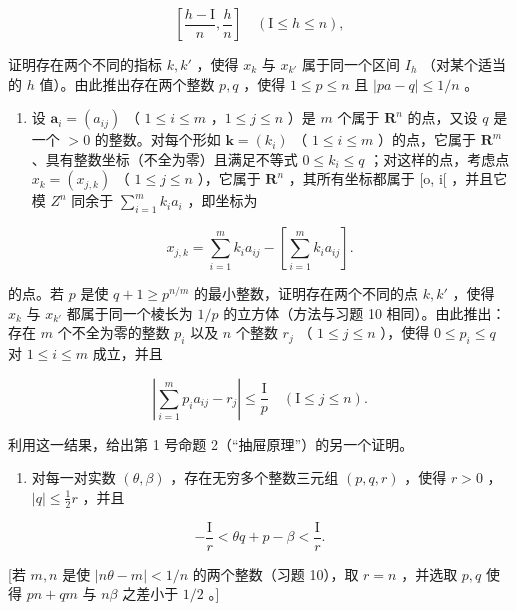\[
\left[ \frac {h - \mathrm{I}}{n}, \frac {h}{n} \right] \quad (\mathrm{I} \leqslant h \leqslant n),
\]

证明存在两个不同的指标 \(k, k'\) ，使得 \(x_k\) 与 \(x_{k'}\) 属于同一个区间 \(I_h\) （对某个适当的 \(h\) 值）。由此推出存在两个整数 \(p, q\) ，使得 \(1 \leqslant p \leqslant n\) 且 \(|pa - q| \leqslant 1 / n\) 。

\begin{enumerate}
\def\labelenumi{\Roman{enumi})}
\setcounter{enumi}{1}
\tightlist
\item
  设 \(\boldsymbol{a}_i = (a_{ij})\) （ \(1 \leqslant i \leqslant m\) ，\(1 \leqslant j \leqslant n\) ）是 \(m\) 个属于 \(\mathbf{R}^n\) 的点，又设 \(q\) 是一个 \(>0\) 的整数。对每个形如 \(\boldsymbol{k} = (k_i)\) （ \(1 \leqslant i \leqslant m\) ）的点，它属于 \(\mathbf{R}^m\) 、具有整数坐标（不全为零）且满足不等式 \(0 \leqslant k_i \leqslant q\) ；对这样的点，考虑点 \(x_k = (x_{j,k})\) （ \(1 \leqslant j \leqslant n\) ），它属于 \(\mathbf{R}^n\) ，其所有坐标都属于 {[}o, i{[} ，并且它模 \(Z^n\) 同余于 \(\sum_{i=1}^{m} k_i a_i\) ，即坐标为
\end{enumerate}

\[
x _ {j, k} = \sum_ {i = 1} ^ {m} k _ {i} a _ {i j} - \left[ \sum_ {i = 1} ^ {m} k _ {i} a _ {i j} \right].
\]

  的点。若 \(p\) 是使 \(q + 1 \geqslant p^{n/m}\) 的最小整数，证明存在两个不同的点 \(k, k'\) ，使得 \(x_k\) 与 \(x_{k'}\) 都属于同一个棱长为 \(1/p\) 的立方体（方法与习题 10 相同）。由此推出：存在 \(m\) 个不全为零的整数 \(p_i\) 以及 \(n\) 个整数 \(r_j\) （ \(1 \leqslant j \leqslant n\) ），使得 \(0 \leqslant p_i \leqslant q\) 对 \(1 \leqslant i \leqslant m\) 成立，并且

\[
\left| \sum_ {i = 1} ^ {m} p _ {i} a _ {i j} - r _ {j} \right| \leqslant \frac {\mathrm{I}}{p} \quad (\mathrm{I} \leqslant j \leqslant n).
\]

利用这一结果，给出第 1 号命题 2（“抽屉原理”）的另一个证明。

\begin{enumerate}
\def\labelenumi{\arabic{enumi})}
\setcounter{enumi}{11}
\tightlist
\item
  对每一对实数 \((\theta, \beta)\) ，存在无穷多个整数三元组 \((p, q, r)\) ，使得 \(r > 0\) ，\(|q| \leqslant \frac{1}{2} r\) ，并且
\end{enumerate}

\[
- \frac {\mathrm{I}}{r} <   \theta q + p - \beta <   \frac {\mathrm{I}}{r}.
\]

{[}若 \(m, n\) 是使 \(|n\theta - m| < 1/n\) 的两个整数（习题 10），取 \(r = n\) ，并选取 \(p, q\) 使得 \(pn + qm\) 与 \(n\beta\) 之差小于 \(1/2\) 。{]}

